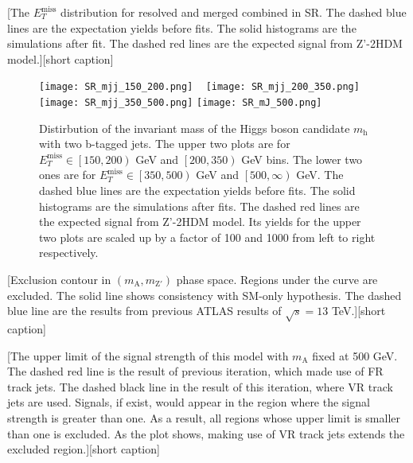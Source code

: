 \documentclass[class=NCU_thesis, crop=false]{standalone}
\begin{document}
	[The $E_T^{\mathrm{miss}}$ distribution for resolved and merged combined in SR. The dashed blue lines are the expectation yields before fits. The solid histograms are the simulations after fit. The dashed red lines are the expected signal from Z'-2HDM model.][short caption]
	
	\begin{figure}[!hbt]
		\centering
		\subcaptionbox
		{\label{fig:subfig_SR_mjj_150_200}}
		{\texttt{[image: SR\_mjj\_150\_200.png]}}
		~
		\subcaptionbox
		{\label{fig:subfig_SR_mjj_200_350}}
		{\texttt{[image: SR\_mjj\_200\_350.png]}}
		\vspace{\baselineskip} %
		\subcaptionbox
		{\label{fig:subfig_SR_mjj_350_500}}
		{\texttt{[image: SR\_mjj\_350\_500.png]}}
		\subcaptionbox
		{\label{fig:subfig_SR_mJ_500}}
		{\texttt{[image: SR\_mJ\_500.png]}}
		\caption{Distirbution of the invariant mass of the Higgs boson candidate $m_{\mathrm{h}}$ with two b-tagged jets. The upper two plots are for $E_T^{\mathrm{miss}} \in \left[150, 200\right)$ GeV and $\left[200, 350\right)$ GeV bins. The lower two ones are for $E_T^{\mathrm{miss}} \in \left[350, 500\right)$ GeV and $\left[500, \infty \right)$ GeV. The dashed blue lines are the expectation yields before fits. The solid histograms are the simulations after fits. The dashed red lines are the expected signal from Z'-2HDM model. Its yields for the upper two plots are scaled up by a factor of 100 and 1000 from left to right respectively.}
		\label{fig:SR_mj}
	\end{figure}
	
	[Exclusion contour in $(m_{\mathrm{A}}, m_{\mathrm{Z'}})$ phase space. Regions under the curve are excluded. The solid line shows consistency with SM-only hypothesis. The dashed blue line are the results from previous ATLAS results of $\sqrt{s} = 13$ TeV.][short caption]
	
	[The upper limit of the signal strength of this model with $m_{\mathrm{A}}$ fixed at 500 GeV. The dashed red line is the result of previous iteration, which made use of FR track jets. The dashed black line in the result of this iteration, where VR track jets are used. Signals, if exist, would appear in the region where the signal strength is greater than one. As a result, all regions whose upper limit is smaller than one is excluded. As the plot shows, making use of VR track jets extends the excluded region.][short caption]
\end{document}
